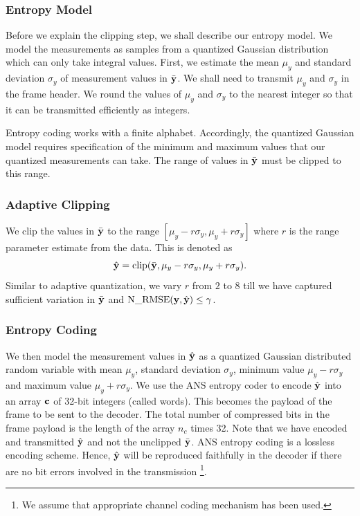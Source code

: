 \subsubsection{Entropy Model}
Before we explain the clipping step, we shall describe
our entropy model.
We model the measurements as samples from a quantized Gaussian
distribution which can only take integral values.
First, we estimate the mean $\mu_y$ and standard deviation $\sigma_y$
of measurement values in $\bar{\mathbf{y}}$.
We shall need to transmit $\mu_y$ and $\sigma_y$ in the frame header.
We round the values of $\mu_y$ and $\sigma_y$ to the nearest integer
so that it can be transmitted efficiently as integers.

Entropy coding works with a finite alphabet.
Accordingly, the quantized Gaussian model
requires specification of the minimum
and maximum values that our quantized
measurements can take. The range of values
in $\bar{\mathbf{y}}$ must be clipped to this range.

\subsubsection{Adaptive Clipping}
We clip the values in $\bar{\mathbf{y}}$ to the range
$[\mu_y - r \sigma_y, \mu_y + r \sigma_y]$
where $r$ is the range parameter estimate from the data.
This is denoted as
\begin{equation}
\hat{\mathbf{y}} = \text{clip}(\bar{\mathbf{y}}, \mu_y - r \sigma_y, \mu_y + r \sigma_y).
\end{equation}
Similar to adaptive quantization, we vary $r$ from $2$ to $8$
till we have captured sufficient variation in $\bar{\mathbf{y}}$
and $\mathrm{N\_RMSE}(\mathbf{y}, \hat{\mathbf{y}}) \leq \gamma$.

\subsubsection{Entropy Coding}
We then model the measurement values in $\hat{\mathbf{y}}$
as a quantized Gaussian distributed random variable
with mean $\mu_y$, standard deviation $\sigma_y$,
minimum value $\mu_y - r \sigma_y$ and maximum value $\mu_y + r \sigma_y$.
We use the ANS entropy coder to encode $\hat{\mathbf{y}}$ into an array
$\mathbf{c}$ of 32-bit integers (called words).
This becomes the payload of the frame to be sent to the decoder.
The total number of compressed bits in the frame payload
is the length of the array $n_c$ times 32.
Note that we have encoded and transmitted $\hat{\mathbf{y}}$
and not the unclipped $\bar{\mathbf{y}}$. ANS entropy coding
is a lossless encoding scheme. Hence, $\hat{\mathbf{y}}$
will be reproduced faithfully in the decoder if there
are no bit errors involved in the transmission
\footnote{We assume that appropriate channel coding
mechanism has been used.}.

